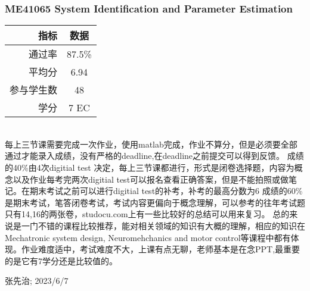 \subsubsection{ME41065 System Identification and Parameter Estimation}
\begin{minipage}{0.45\textwidth}
\centering
{}
\end{minipage}%
\begin{minipage}{0.45\textwidth}
\raggedleft
\begin{tabular}{r|c}
\textbf{指标} & \textbf{数据} \\ \hline
通过率 & 87.5\% \\ 
平均分 & 6.94 \\ 
参与学生数 & 48 \\
学分 & 7 EC\\
\end{tabular}
\end{minipage}\\

每上三节课需要完成一次作业，使用matlab完成，作业不算分，但是必须要全部通过才能录入成绩，没有严格的deadline,在deadline之前提交可以得到反馈。
成绩的40\%由4次digitial test 决定，每上三节课都进行，形式是闭卷选择题，内容为概念以及作业每考完两次digitial test可以报名查看正确答案，但是不能拍照或做笔记。在期末考试之前可以进行digitial test的补考，补考的最高分数为6
成绩的60\%是期末考试，笔答闭卷考试，考试内容更偏向于概念理解，可以参考的往年考试题只有14,16的两张卷，studocu.com上有一些比较好的总结可以用来复习。
总的来说是一门不错的课程比较推荐，能对相关领域的知识有大概的理解，相应的知识在Mechatronic system design, Neuromehchanics and motor control等课程中都有体现。作业难度适中，考试难度不大，上课有点无聊，老师基本是在念PPT,最重要的是它有7学分还是比较值的。
\begin{flushright}
张先治; 2023/6/7
\end{flushright}

